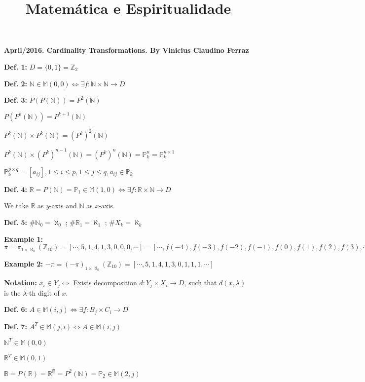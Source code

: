 \documentclass[10pt,a4paper]{article}
\title{Matem\'atica e Espiritualidade}
\date{}
\begin{document}
\textbf{April/2016. Cardinality Transformations. By Vinicius Claudino Ferraz}

\vspace{3mm}

\textbf{Def. 1:} $D = \{0, 1 \} = \mathbb{Z}_2$

\textbf{Def. 2:} $\mathbb{N} \in \mathbb{M}(0, 0) \Leftrightarrow \exists f : \mathbb{N} \times \mathbb{N} \rightarrow D$

\textbf{Def. 3:} $P(P(\mathbb{N})) = P^2(\mathbb{N})$ 

$P(P^{k}(\mathbb{N})) = P^{k+1}(\mathbb{N})$

$P^k(\mathbb{N}) \times P^k(\mathbb{N}) = (P^k)^2 (\mathbb{N})$

$P^k(\mathbb{N}) \times (P^k)^{n-1}(\mathbb{N}) = (P^k)^n (\mathbb{N}) = \mathbb{P}_k^n = \mathbb{P}_k^{n \times 1}$

$\mathbb{P}_k^{p \times q} = [a_{ij}], 1 \le i \le p, 1 \le j \le q, a_{ij} \in \mathbb{P}_k $

\textbf{Def. 4:} $\mathbb{R} = P(\mathbb{N}) = \mathbb{P}_1 \in \mathbb{M}(1, 0) \Leftrightarrow \exists f : \mathbb{R} \times \mathbb{N} \rightarrow D$

We take $\mathbb{R}$ as $y$-axis and $\mathbb{N}$ as $x$-axis.

\textbf{Def. 5:} $\# \mathbb{N}_0 = \aleph_0$ ; $\# \mathbb{R}_1 = \aleph_1$ ; $\# X_k = \aleph_k$

\textbf{Example 1:} $\pi = \pi_{1 \times \aleph_0}(\mathbb{Z}_{10}) = [ \cdots, 5, 1, 4, 1, 3, 0, 0, 0, \cdots ] = [ \cdots, f(-4), f(-3), f(-2), f(-1), f(0), f(1), f(2), f(3), \cdots ] $

\textbf{Example 2:} $-\pi = (-\pi)_{1 \times \aleph_0}(\mathbb{Z}_{10}) = [ \cdots, 5, 1, 4, 1, 3, 0, 1, 1, 1, \cdots ] $

\textbf{Notation:} $x_i \in Y_j \Leftrightarrow $ Exists decomposition $d : Y_j \times X_i \rightarrow D $, such that $d(x, \lambda)$ is the $\lambda$-th digit of $x$.

\textbf{Def. 6:} $A \in \mathbb{M}(i, j) \Leftrightarrow \exists f : B_j \times C_i \rightarrow D$

\textbf{Def. 7:} $A^T \in \mathbb{M}(j, i) \Leftrightarrow A \in \mathbb{M}(i, j)$

$\mathbb{N}^T \in \mathbb{M}(0,0)$

$\mathbb{R}^T \in \mathbb{M}(0,1)$

$\mathbb{B} = P(\mathbb{R}) = \mathbb{R}^\mathbb{R} = P^2(\mathbb{N}) = \mathbb{P}_2 \in \mathbb{M}(2,j)$
\end{document}
